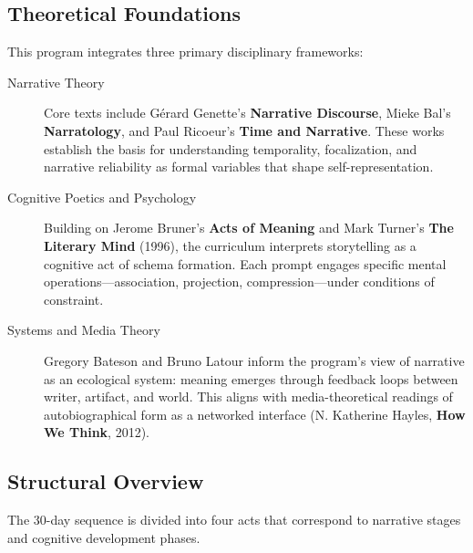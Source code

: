 \documentclass[11pt]{article}
\begin{document}
\subsection*{Theoretical Foundations}
\label{sec:org13a834e}

This program integrates three primary disciplinary frameworks:

\begin{description}
\item[{Narrative Theory}] Core texts include Gérard Genette’s \textbf{Narrative Discourse}, Mieke Bal’s \textbf{Narratology}, and Paul Ricoeur’s \textbf{Time and Narrative}. These works establish the basis for understanding temporality, focalization, and narrative reliability as formal variables that shape self-representation.

\item[{Cognitive Poetics and Psychology}] Building on Jerome Bruner’s \textbf{Acts of Meaning} and Mark Turner’s \textbf{The Literary Mind} (1996), the curriculum interprets storytelling as a cognitive act of schema formation. Each prompt engages specific mental operations—association, projection, compression—under conditions of constraint.

\item[{Systems and Media Theory}] Gregory Bateson and Bruno Latour inform the program’s view of narrative as an ecological system: meaning emerges through feedback loops between writer, artifact, and world. This aligns with media-theoretical readings of autobiographical form as a networked interface (N. Katherine Hayles, \textbf{How We Think}, 2012).
\end{description}
\subsection*{Structural Overview}
\label{sec:org06d3b0c}
The 30-day sequence is divided into four acts that correspond to narrative stages and cognitive development phases.
\end{document}
